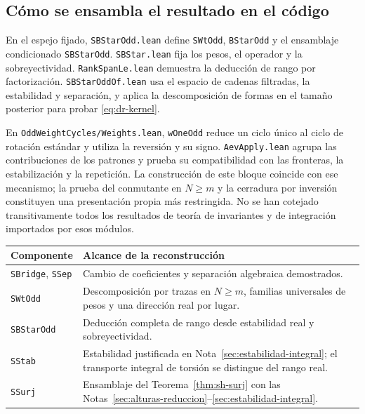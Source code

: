 \subsection{Cómo se ensambla el resultado en el código}

En el espejo fijado, \texttt{SBStarOdd.lean} define \texttt{SWtOdd}, \texttt{BStarOdd} y el ensamblaje condicionado \texttt{SBStarOdd}. \texttt{SBStar.lean} fija los pesos, el operador y la sobreyectividad. \texttt{RankSpanLe.lean} demuestra la deducción de rango por factorización. \texttt{SBStarOddOf.lean} usa el espacio de cadenas filtradas, la estabilidad y separación, y aplica la descomposición de formas en el tamaño posterior para probar \eqref{eq:dr-kernel}.

En \texttt{OddWeightCycles/Weights.lean}, \texttt{wOneOdd} reduce un ciclo único al ciclo de rotación estándar y utiliza la reversión y su signo. \texttt{AevApply.lean} agrupa las contribuciones de los patrones y prueba su compatibilidad con las fronteras, la estabilización y la repetición. La construcción de este bloque coincide con ese mecanismo; la prueba del conmutante en $N\ge m$ y la cerradura por inversión constituyen una presentación propia más restringida. No se han cotejado transitivamente todos los resultados de teoría de invariantes y de integración importados por esos módulos.

\begin{center}\small
\begin{tabularx}{\textwidth}{@{}p{}Y@{}}
\toprule
Componente & Alcance de la reconstrucción\\\midrule
\texttt{SBridge}, \texttt{SSep} & Cambio de coeficientes y separación algebraica demostrados.\\
\texttt{SWtOdd} & Descomposición por trazas en $N\ge m$, familias universales de pesos y una dirección real por lugar.\\
\texttt{SBStarOdd} & Deducción completa de rango desde estabilidad real y sobreyectividad.\\
\texttt{SStab} & Estabilidad justificada en Nota~\ref{sec:estabilidad-integral}; el transporte integral de torsión se distingue del rango real.\\
\texttt{SSurj} & Ensamblaje del Teorema~\ref{thm:sh-surj} con las Notas~\ref{sec:alturas-reduccion}--\ref{sec:estabilidad-integral}.\\\bottomrule
\end{tabularx}
\end{center}

